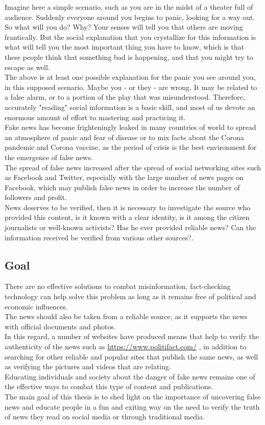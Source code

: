 \documentclass[12pt, letterpaper, twoside]{article}
\begin{document}
Imagine here a simple scenario, such as you are in the midst of a theater full of audience. Suddenly everyone around you begins to panic, looking for a way out. So what will you do? Why? Your senses will tell you that others are moving frantically. But the social explanation that you crystallize for this information is what will tell you the most important thing you have to know, which is that these people think that something bad is happening, and that you might try to escape as well.\\
The above is at least one possible explanation for the panic you see around you, in this supposed scenario. Maybe you - or they - are wrong. It may be related to a false alarm, or to a portion of the play that was misunderstood. Therefore, accurately "reading" social information is a basic skill, and most of us devote an enormous amount of effort to mastering and practicing it.\\
Fake news has become frighteningly leaked in many countries of  world to spread an atmosphere of panic and fear of disease or to mix facts about the Corona pandemic and Corona vaccine, as the period of crisis is the best environment for the emergence of false news.\\
The spread of false news increased after the spread of social networking sites such as Facebook and Twitter, especially with the large number of news pages on Facebook, which may publish false news in order to increase the number of followers and profit.\\
 News deserves to be verified, then it is necessary to investigate the source who provided this content, is it known with a clear identity, is it among the citizen journalists or well-known activists? Has he ever provided reliable news? Can the information received be verified from various other sources?.\\
\subsection{Goal}
There are no effective solutions to combat misinformation, fact-checking technology can help solve this problem as long as it remains free of political and economic influences.\\
The news should also be taken from a reliable source, as it supports the news with official documents and photos.\\
In this regard, a number of websites have produced means that help to verify the authenticity of the news such as \url{https://www.politifact.com/} , in addition to searching for other reliable and popular sites that publish the same news, as well as verifying the pictures and videos that are relating.\\
Educating individuals and society about the danger of fake news remains one of the effective ways to combat this type of content and publications.\\
The main goal of this thesis is to shed light on the importance of uncovering false news and educate people in a fun and exiting way on the need to verify the truth of news they read on social media or through traditional media.\\
\end{document}
